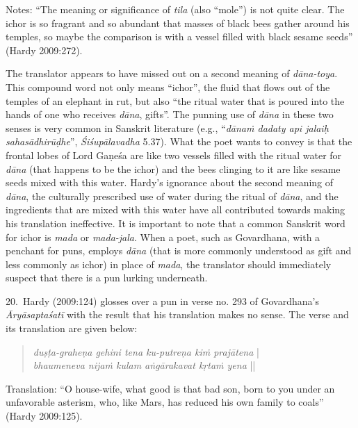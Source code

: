 Notes: “The meaning or significance of \textsl{tila} (also “mole”) is not quite clear. The ichor is so fragrant and so abundant that masses of black bees gather around his temples, so maybe the comparison is with a vessel filled with black sesame seeds” (Hardy 2009:272).

The translator appears to have missed out on a second meaning of \textsl{dāna-toya}. This compound word not only means “ichor”, the fluid that flows out of the temples of an elephant in rut, but also “the ritual water that is poured into the hands of one who receives \textsl{dāna}, gifts”. The punning use of \textsl{dāna} in these two senses is very common in Sanskrit literature (e.g., “\textsl{dānaṁ dadaty api jalaiḥ sahasādhirūḍhe}”, \textsl{Śiśupālavadha} 5.37). What the poet wants to convey is that the frontal lobes of Lord Gaṇeśa are like two vessels filled with the ritual water for \textsl{dāna} (that happens to be the ichor) and the bees clinging to it are like sesame seeds mixed with this water. Hardy’s ignorance about the second meaning of \textsl{dāna}, the culturally prescribed use of water during the ritual of \textsl{dāna}, and the ingredients that are mixed with this water have all contributed towards making his translation ineffective. It is important to note that a common Sanskrit word for ichor is \textsl{mada} or \textsl{mada-jala}. When a poet, such as Govardhana, with a penchant for puns, employs \textsl{dāna} (that is more commonly understood as gift and less commonly as ichor) in place of \textsl{mada}, the translator should immediately suspect that there is a pun lurking underneath. 

20.~Hardy (2009:124) glosses over a pun in verse no. 293 of Govardhana’s \textsl{Āryāsaptaśatī} with the result that his translation makes no sense. The verse and its translation are given below:
\begin{quote}
\textsl{duṣṭa-graheṇa gehini tena ku-putreṇa kiṁ prajātena} |\\
\textsl{bhaumeneva nijaṁ kulam aṅgārakavat kṛtaṁ yena} ||
\end{quote}

\begin{myquote}
Translation: “O house-wife, what good is that bad son, born to you under an unfavorable asterism, who, like Mars, has reduced his own family to coals” 
\hfill(Hardy 2009:125).
\end{myquote}

